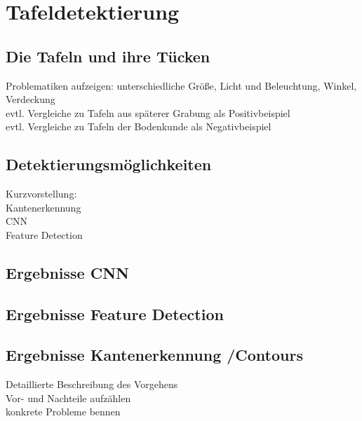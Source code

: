 \section{Tafeldetektierung}
\subsection{Die Tafeln und ihre Tücken}
Problematiken aufzeigen: unterschiedliche Größe, Licht und Beleuchtung, Winkel, Verdeckung\\
evtl. Vergleiche zu Tafeln aus späterer Grabung als Positivbeispiel\\
evtl. Vergleiche zu Tafeln der Bodenkunde als Negativbeispiel\\
\subsection{Detektierungsmöglichkeiten}
Kurzvorstellung:\\
Kantenerkennung\\
CNN\\
Feature Detection\\

\subsection{Ergebnisse CNN}

\subsection{Ergebnisse Feature Detection}

\subsection{Ergebnisse Kantenerkennung /Contours}
Detaillierte Beschreibung des Vorgehens\\
Vor- und Nachteile aufzählen\\
konkrete Probleme bennen\\
